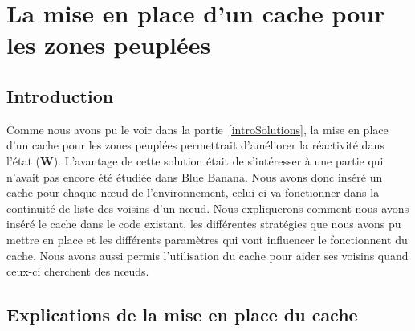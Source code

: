 \section{La mise en place d'un cache pour les zones peuplées}
\subsection{Introduction}
Comme nous avons pu le voir dans la partie~\ref{introSolutions}, la mise en place d'un cache pour les zones peuplées permettrait d'améliorer la réactivité dans l'état (\textbf{W}). L'avantage de cette solution était de s'intéresser à une partie qui n'avait pas encore été étudiée dans Blue Banana. Nous avons donc inséré un cache pour chaque nœud de l'environnement, celui-ci va fonctionner dans la continuité de liste des voisins d'un nœud. Nous expliquerons comment nous avons inséré le cache dans le code existant, les différentes stratégies que nous avons pu mettre en place et les différents paramètres qui vont influencer le fonctionnent du cache. Nous avons aussi permis l'utilisation du cache pour aider ses voisins quand ceux-ci cherchent des nœuds.
 
\subsection{Explications de la mise en place du cache}

